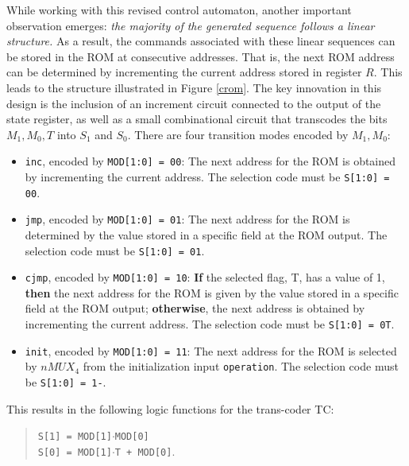 While working with this revised control automaton, another important observation emerges: {\em the majority of the generated sequence follows a linear structure.} As a result, the commands associated with these linear sequences can be stored in the ROM at consecutive addresses. That is, the next ROM address can be determined by incrementing the current address stored in register $R$. This leads to the structure illustrated in Figure \ref{crom}. The key innovation in this design is the inclusion of an increment circuit connected to the output of the state register, as well as a small combinational circuit that transcodes the bits $M_{1}, M_{0}, T$ into $S_{1}$ and $S_{0}$. There are four transition modes encoded by $M_{1}, M_{0}$:



\begin{itemize}
\item {\tt inc}, encoded by {\tt MOD[1:0] = 00}: The next address 
for the ROM is obtained by incrementing the current address. 
The selection code must be {\tt S[1:0] = 00}.

\item {\tt jmp}, encoded by {\tt MOD[1:0] = 01}: The next address 
for the ROM is determined by the value stored in a specific field 
at the ROM output. The selection code must be {\tt S[1:0] = 01}.

\item {\tt cjmp}, encoded by {\tt MOD[1:0] = 10}: {\bf If} the 
selected flag, T, has a value of 1, {\bf then} the next address 
for the ROM is given by the value stored in a specific field at the 
ROM output; {\bf otherwise}, the next address is obtained by incrementing 
the current address. The selection code must be {\tt S[1:0] = 0T}.

\item {\tt init}, encoded by {\tt MOD[1:0] = 11}: The next address 
for the ROM is selected by $nMUX_{4}$ from the initialization input 
{\tt operation}. The selection code must be {\tt S[1:0] = 1-}.
\end{itemize}

This results in the following logic functions for the trans-coder TC:
\begin{quote}
{\tt S[1] = MOD[1]$\cdot$MOD[0]} \\ 
{\tt S[0] = MOD[1]$\cdot$T + MOD[0]}.
\end{quote}

